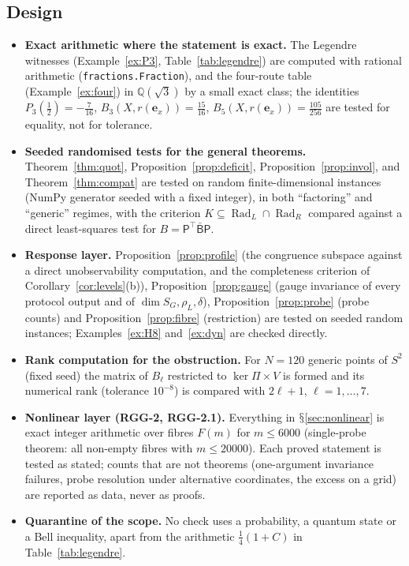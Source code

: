 \documentclass[11pt,a4paper]{article}
\renewcommand{\S}{\ensuremath{\mathsection}}
\newcommand{\Rad}{\operatorname{Rad}}
\newcommand{\defic}{\delta}
\theoremstyle{plain}
\theoremstyle{definition}
\begin{document}
\subsection{Design}
\begin{itemize}
\item \textbf{Exact arithmetic where the statement is exact.} The Legendre witnesses (Example~\ref{ex:P3}, Table~\ref{tab:legendre}) are computed with rational arithmetic (\texttt{fractions.Fraction}), and the four-route table (Example~\ref{ex:four}) in $\mathbb Q(\sqrt3)$ by a small exact class; the identities $P_3(\tfrac12)=-\tfrac7{16}$, $B_3(X,r(\mathbf e_x))=\tfrac{15}{16}$, $B_5(X,r(\mathbf e_x))=\tfrac{105}{256}$ are tested for equality, not for tolerance.
\item \textbf{Seeded randomised tests for the general theorems.} Theorem~\ref{thm:quot}, Proposition~\ref{prop:deficit}, Proposition~\ref{prop:invol}, and Theorem~\ref{thm:compat} are tested on random finite-dimensional instances (NumPy generator seeded with a fixed integer), in both ``factoring'' and ``generic'' regimes, with the criterion $K\subseteq\Rad_L\cap\Rad_R$ compared against a direct least-squares test for $B=\mathsf P^{\!\top}\bar{\mathsf B}\mathsf P$.
\item \textbf{Response layer.} Proposition~\ref{prop:profile} (the congruence subspace against a direct unobservability computation, and the completeness criterion of Corollary~\ref{cor:levels}(b)), Proposition~\ref{prop:gauge} (gauge invariance of every protocol output and of $\dim S_G,\rho_L,\defic$), Proposition~\ref{prop:probe} (probe counts) and Proposition~\ref{prop:fibre} (restriction) are tested on seeded random instances; Examples~\ref{ex:H8} and~\ref{ex:dyn} are checked directly.
\item \textbf{Rank computation for the obstruction.} For $N=120$ generic points of $S^2$ (fixed seed) the matrix of $B_\ell$ restricted to $\ker\Pi\times V$ is formed and its numerical rank (tolerance $10^{-8}$) is compared with $2\ell+1$, $\ell=1,\dots,7$.
\item \textbf{Nonlinear layer (RGG-2, RGG-2.1).} Everything in \S\ref{sec:nonlinear} is exact integer arithmetic over fibres $F(m)$ for $m\le6000$ (single-probe theorem: all non-empty fibres with $m\le20000$). Each proved statement is tested as stated; counts that are not theorems (one-argument invariance failures, probe resolution under alternative coordinates, the excess on a grid) are reported as data, never as proofs.
\item \textbf{Quarantine of the scope.} No check uses a probability, a quantum state or a Bell inequality, apart from the arithmetic $\frac14(1+C)$ in Table~\ref{tab:legendre}.
\end{itemize}
\end{document}
